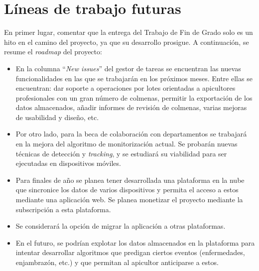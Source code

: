 \section{Líneas de trabajo futuras}\label{luxedneas-de-trabajo-futuras}

En primer lugar, comentar que la entrega del Trabajo de Fin de Grado
solo es un hito en el camino del proyecto, ya que su desarrollo
prosigue. A continuación, se resume el \emph{roadmap} del proyecto:

\begin{itemize}
\tightlist
\item  En la columna ``\emph{New issues}'' del gestor de tareas se encuentran
  las nuevas funcionalidades en las que se trabajarán en los próximos
  meses. Entre ellas se encuentran: dar soporte a operaciones por lotes
  orientadas a apicultores profesionales con un gran número de colmenas,
  permitir la exportación de los datos almacenados, añadir informes de
  revisión de colmenas, varias mejoras de usabilidad y diseño, etc.
\item
  Por otro lado, para la beca de colaboración con departamentos se
  trabajará en la mejora del algoritmo de monitorización actual. Se
  probarán nuevas técnicas de detección y \emph{tracking}, y se
  estudiará su viabilidad para ser ejecutadas en dispositivos móviles.
\item
  Para finales de año se planea tener desarrollada una plataforma en la
  nube que sincronice los datos de varios dispositivos y permita el
  acceso a estos mediante una aplicación web. Se planea monetizar el
  proyecto mediante la subscripción a esta plataforma.
\item
  Se considerará la opción de migrar la aplicación a otras plataformas.
\item
  En el futuro, se podrían explotar los datos almacenados en la
  plataforma para intentar desarrollar algoritmos que predigan ciertos
  eventos (enfermedades, enjambrazón, etc.) y que permitan al apicultor
  anticiparse a estos.
\end{itemize}
